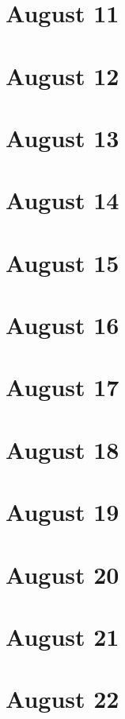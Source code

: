 \section{August 11}

\section{August 12}

\section{August 13}

\section{August 14}

\section{August 15}

\section{August 16}

\section{August 17}

\section{August 18}

\section{August 19}

\section{August 20}

\section{August 21}

\section{August 22}

